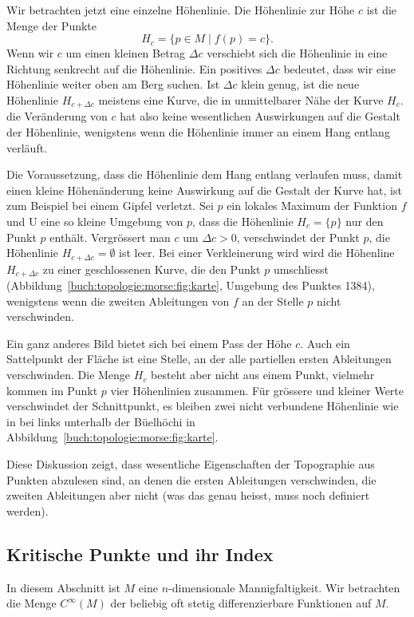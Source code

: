Wir betrachten jetzt eine einzelne Höhenlinie.
Die Höhenlinie zur Höhe $c$ ist die Menge der Punkte
\[
H_c
=
\{ p\in M\mid f(p) = c \}.
\]
Wenn wir $c$ um einen kleinen Betrag $\Delta c$ verschiebt sich
die Höhenlinie in eine Richtung senkrecht auf die Höhenlinie.
Ein positives $\Delta c$ bedeutet, dass wir eine Höhenlinie weiter
oben am Berg suchen.
Ist $\Delta c$ klein genug, ist die neue Höhenlinie $H_{c+\Delta c}$
meistens eine Kurve, die in unmittelbarer Nähe der Kurve $H_c$.
die Veränderung von $c$ hat also keine wesentlichen Auswirkungen
auf die Gestalt der Höhenlinie, wenigstens wenn die Höhenlinie
immer an einem Hang entlang verläuft.

Die Voraussetzung, dass die Höhenlinie dem Hang entlang verlaufen
muss, damit einen kleine Höhenänderung keine Auswirkung auf die
Gestalt der Kurve hat, ist zum Beispiel bei einem Gipfel verletzt.
Sei $p$ ein lokales Maximum der Funktion $f$ und U eine so kleine
Umgebung von $p$, dass die Höhenlinie $H_c = \{p\}$ nur den Punkt $p$
enthält.
Vergrössert man $c$ um $\Delta c>0$, verschwindet der Punkt $p$,
die Höhenlinie $H_{c+\Delta c}=\emptyset$ ist leer.
Bei einer Verkleinerung wird wird die Höhenline $H_{c+\Delta c}$ zu
einer geschlossenen Kurve, die den Punkt $p$ umschliesst
(Abbildung~\ref{buch:topologie:morse:fig:karte}, Umgebung des Punktes 1384),
wenigstens wenn die zweiten Ableitungen von $f$ an der Stelle $p$
nicht verschwinden.

Ein ganz anderes Bild bietet sich bei einem Pass der Höhe $c$.
Auch ein Sattelpunkt der Fläche ist eine Stelle, an der
alle partiellen ersten Ableitungen verschwinden.
Die Menge $H_c$ besteht aber nicht aus einem Punkt, vielmehr
kommen im Punkt $p$ vier Höhenlinien zusammen.
Für grössere und kleiner Werte verschwindet der Schnittpunkt,
es bleiben zwei nicht verbundene Höhenlinie wie in
bei links unterhalb der Büelhöchi in
Abbildung~\ref{buch:topologie:morse:fig:karte}.

Diese Diskussion zeigt, dass wesentliche Eigenschaften der Topographie
aus Punkten abzulesen sind, an denen die ersten Ableitungen verschwinden,
die zweiten Ableitungen aber nicht (was das genau heisst, muss noch
definiert werden).

%
%
\subsection{Kritische Punkte und ihr Index}
In diesem Abschnitt ist $M$ eine $n$-dimensionale Mannigfaltigkeit.
Wir betrachten die Menge $C^\infty(M)$ der beliebig oft stetig
differenzierbare Funktionen auf $M$.

